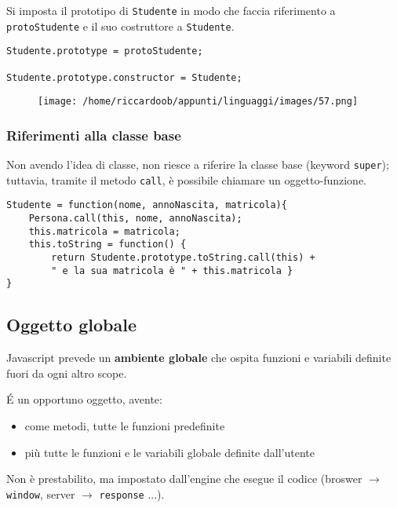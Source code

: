 Si imposta il prototipo di \texttt{Studente} in modo che faccia riferimento a \texttt{protoStudente} e il suo costruttore a \texttt{Studente}.
\begin{verbatim}
Studente.prototype = protoStudente;

Studente.prototype.constructor = Studente;
\end{verbatim}

\begin{figure}[H]
    \centering
    \texttt{[image: /home/riccardoob/appunti/linguaggi/images/57.png]}
\end{figure}

\subsubsection{Riferimenti alla classe base}
Non avendo l'idea di classe, non riesce a riferire la classe base (keyword \texttt{super}); tuttavia, tramite il metodo \texttt{call}, è possibile chiamare un oggetto-funzione.
\begin{verbatim}
Studente = function(nome, annoNascita, matricola){
    Persona.call(this, nome, annoNascita);
    this.matricola = matricola;
    this.toString = function() {
        return Studente.prototype.toString.call(this) +
        " e la sua matricola è " + this.matricola }
}
\end{verbatim}

\subsection{Oggetto globale}
Javascript prevede un \textbf{ambiente globale} che ospita funzioni e variabili definite fuori da ogni altro scope.

É un opportuno oggetto, avente:
\begin{itemize}
    \item come metodi, tutte le funzioni predefinite
    \item più tutte le funzioni e le variabili globale definite dall'utente
\end{itemize}

Non è prestabilito, ma impostato dall'engine che esegue il codice (broswer $\rightarrow$ \texttt{window}, server $\rightarrow$ \texttt{response} ...).

